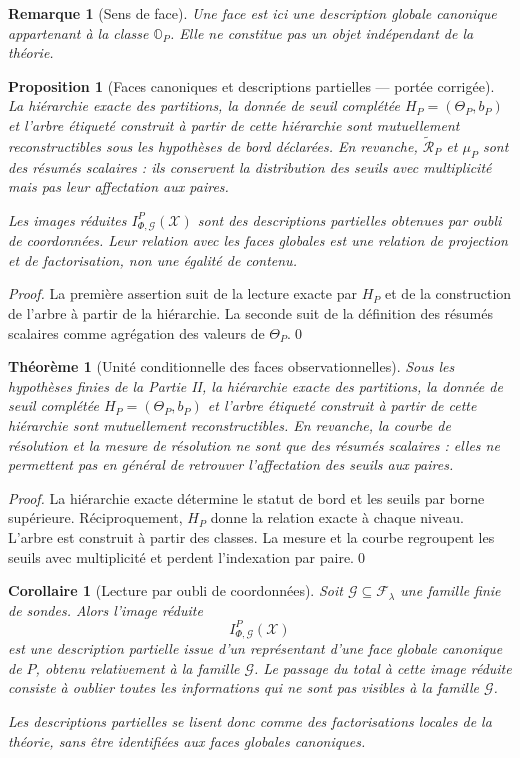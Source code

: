 \documentclass[11pt,a4paper,openany]{book}
\newtheorem{proposition}[definition]{Proposition}
\newtheorem{theorem}[definition]{Théorème}
\newtheorem{corollary}[definition]{Corollaire}
\newtheorem{remark}[definition]{Remarque}
\begin{document}
\begin{remark}[Sens de face]
Une face est ici une description globale canonique appartenant à la classe \(\mathbb O_P\). Elle ne constitue pas un objet indépendant de la théorie.
\end{remark}

\begin{proposition}[Faces canoniques et descriptions partielles — portée corrigée]
La hiérarchie exacte des partitions, la donnée de seuil complétée \(H_P=(\Theta_P,b_P)\) et l'arbre étiqueté construit à partir de cette hiérarchie sont mutuellement reconstructibles sous les hypothèses de bord déclarées. En revanche, \(\widetilde{\mathcal R}_P\) et \(\mu_P\) sont des résumés scalaires : ils conservent la distribution des seuils avec multiplicité mais pas leur affectation aux paires.

Les images réduites \(I_{\Phi,\mathcal G}^P(\mathcal X)\) sont des descriptions partielles obtenues par oubli de coordonnées. Leur relation avec les faces globales est une relation de projection et de factorisation, non une égalité de contenu.
\end{proposition}
\begin{proof}
La première assertion suit de la lecture exacte par \(H_P\) et de la construction de l'arbre à partir de la hiérarchie. La seconde suit de la définition des résumés scalaires comme agrégation des valeurs de \(\Theta_P\).\qed\end{proof}

\begin{theorem}[Unité conditionnelle des faces observationnelles]
Sous les hypothèses finies de la Partie II, la hiérarchie exacte des partitions, la donnée de seuil complétée \(H_P=(\Theta_P,b_P)\) et l'arbre étiqueté construit à partir de cette hiérarchie sont mutuellement reconstructibles. En revanche, la courbe de résolution et la mesure de résolution ne sont que des résumés scalaires : elles ne permettent pas en général de retrouver l'affectation des seuils aux paires.
\end{theorem}
\begin{proof}
La hiérarchie exacte détermine le statut de bord et les seuils par borne supérieure. Réciproquement, \(H_P\) donne la relation exacte à chaque niveau. L'arbre est construit à partir des classes. La mesure et la courbe regroupent les seuils avec multiplicité et perdent l'indexation par paire.\qed\end{proof}

\begin{corollary}[Lecture par oubli de coordonnées]
Soit \(\mathcal G\subseteq\mathcal F_\lambda\) une famille finie de sondes. Alors l'image réduite
\[
I_{\Phi,\mathcal G}^P(\mathcal X)
\]
est une description partielle issue d'un représentant d'une face globale canonique de \(P\), obtenu relativement à la famille \(\mathcal G\). Le passage du total à cette image réduite consiste à oublier toutes les informations qui ne sont pas visibles à la famille \(\mathcal G\).

Les descriptions partielles se lisent donc comme des factorisations locales de la théorie, sans être identifiées aux faces globales canoniques.
\end{corollary}
\end{document}
